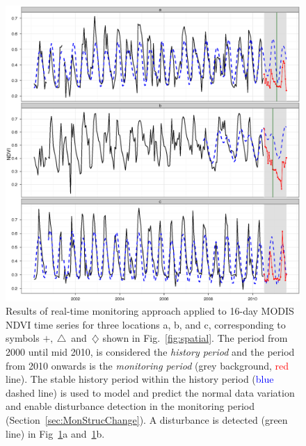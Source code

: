 \documentclass[authoryear,preprint,review,10pt]{elsarticle}
\begin{document}
\begin{figure}[htp]
\centering
    \includegraphics[width=1\textwidth]{figs/tsexampleSOM.eps}
  \caption{
 Results of real-time monitoring approach applied to 16-day MODIS NDVI time series for three locations a, b, and c, corresponding to symbols $+,~\triangle$~and~$\diamondsuit$ shown in Fig.~\ref{fig:spatial}. The period from 2000 until mid 2010, is considered the \emph{history period} and the period from 2010 onwards is the \emph{monitoring period} (grey background, \textcolor{red} {red} line). The stable history period within the history period (\textcolor{blue} {blue} dashed line) is used to model and predict the normal data variation and enable disturbance detection in the monitoring period (Section~\ref{sec:MonStrucChange}).  A disturbance is detected (\textcolor{OliveGreen} {green} line) in Fig~\ref{fig:realmon}a and~\ref{fig:realmon}b.}
  \label{fig:realmon}
\end{figure}
 
\end{document}
